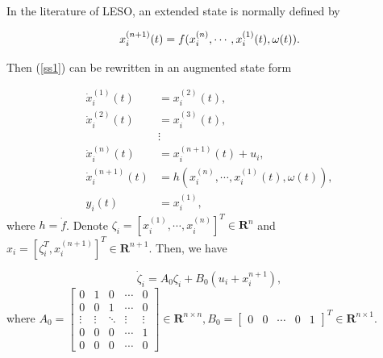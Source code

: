 \documentclass[english]{cccconf}
\begin{document}
In the literature of LESO, an extended state is normally defined by \cite{Huang2017}

\begin{equation}
  \label{ss2}
   x_i^{(n+1)}(t) = f(x_i^{(n)},\cdots, x_i^{(1)}(t),\omega(t)).\\
\end{equation}

Then (\ref{ss1}) can be rewritten in an augmented state form

\begin{equation}
  \label{ss3}
  \begin{aligned}
  \dot x_i^{(1)}(t) &= x_i^{(2)}(t),\\
  \dot x_i^{(2)}(t) &= x_i^{(3)}(t),\\
  & \vdots \\
  \dot x_i^{(n)}(t) &= x_i^{(n+1)}(t)+u_i,\\
  \dot x_i^{(n+1)}(t) &= h(x_i^{(n)},\cdots, x_i^{(1)}(t),\omega(t)),\\
  y_i(t) &= x_i^{(1)},
  \end{aligned}
\end{equation}where $h=\dot f$. 
Denote $\zeta_i = \left[ x_i^{(1)},\cdots, x_i^{(n)} \right]^T \in \mathbf R^n$ and $x_i=\left[ \zeta_i^{T},x_i^{(n+1)} \right]^T \in \mathbf R^{n+1}$. Then, we have

\begin{equation}
  \label{ss4}
  \dot \zeta_i = A_0  \zeta_i + B_0 (u_i +  x_i^{n+1}),
  \end{equation}where $A_{0}=\begin{bmatrix} 0 & 1 & 0 & \cdots & 0\\ 0 & 0 & 1 & \cdots & 0\\ \vdots & \vdots & \ddots & \vdots & \vdots \\ 0 & 0 & 0 & \cdots & 1\\ 0 & 0 & 0 & \cdots & 0 \end{bmatrix} \in \mathbf R^{n \times n}, B_{0}=\begin{bmatrix} 0 & 0 & \cdots & 0 & 1\end{bmatrix} ^T \in \mathbf R^{n \times 1}$.
\end{document}
